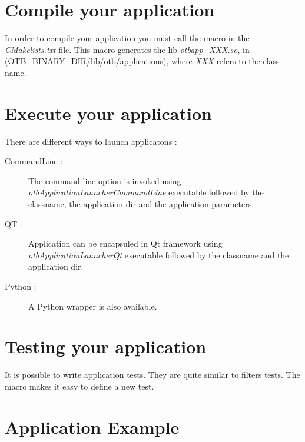 \section{Compile your application}

In order to compile your application you must call the macro  in the \emph{CMakelists.txt} file. 
This macro generates the lib \emph{otbapp\_XXX.so}, in (OTB\_BINARY\_DIR/lib/otb/applications), where \emph{XXX} refers to the class name.

\section{Execute your application}

There are different ways to launch applicatons :

\begin{description}
\item[CommandLine :] The command line option is invoked using \emph{otbApplicationLauncherCommandLine} executable followed by the classname, the application dir and the application parameters.
\item[QT :] Application can be encapsuled in Qt framework using \emph{otbApplicationLauncherQt} executable followed by the classname and the application dir.
\item[Python :] A Python wrapper is also available.
\end{description}


\section{Testing your application}
\label{sec:appTesting}
It is possible to write application tests. They are quite similar to filters tests.
The macro  makes it easy to define a new test.


\section{Application Example}
\label{sec:ApplicationExample}
\ifitkFullVersion

\fi

